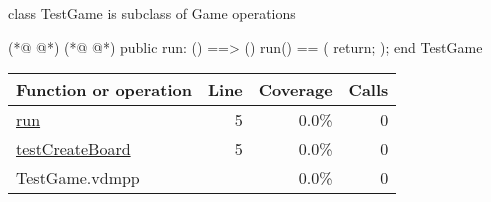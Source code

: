 \begin{vdmpp}[breaklines=true]
class TestGame is subclass of Game
operations
 
 
(*@
\label{run:5}
@*)
(*@
\label{testCreateBoard:5}
@*)
 public run: () ==> ()
  run() == (
   return;
 );
end TestGame
\end{vdmpp}
\bigskip
\begin{longtable}{|l|r|r|r|}
\hline
Function or operation & Line & Coverage & Calls \\
\hline
\hline
\hyperref[run:5]{run} & 5&0.0\% & 0 \\
\hline
\hyperref[testCreateBoard:5]{testCreateBoard} & 5&0.0\% & 0 \\
\hline
\hline
TestGame.vdmpp & & 0.0\% & 0 \\
\hline
\end{longtable}

